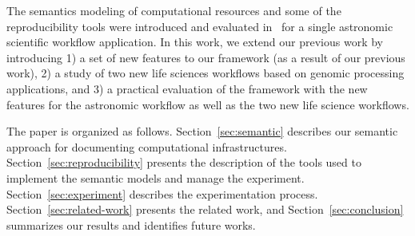
The semantics modeling of computational resources and some of the reproducibility tools 
were introduced and evaluated in~\cite{SantanaPerez-REPPAR-2014} for a single astronomic 
scientific workflow application. In this work, we extend our previous work by introducing 1) a set 
of new features to our framework (as a result of our previous work), 2) a study of two new life 
sciences workflows based on genomic processing applications, and 3) a practical evaluation 
of the framework with the new features for the astronomic workflow as well as the two new 
life science workflows. 

The paper is organized as follows. Section~\ref{sec:semantic} describes our semantic approach for documenting computational infrastructures. Section~\ref{sec:reproducibility} presents the description of the tools used to implement the semantic models and manage the experiment. Section~\ref{sec:experiment} describes the experimentation process. Section~\ref{sec:related-work} presents the related work, and Section~\ref{sec:conclusion} summarizes our results and identifies future works.


